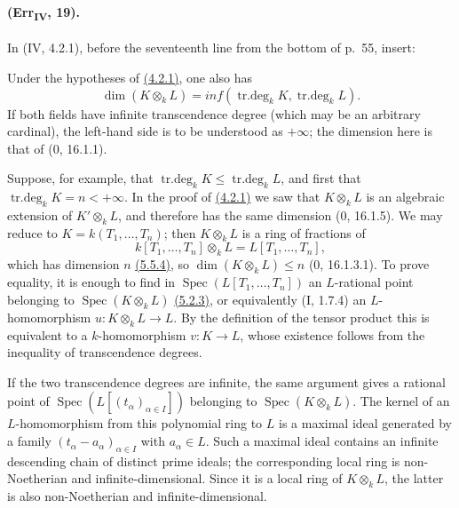 \paragraph{(Err\textsubscript{IV}, 19).}
In (IV, 4.2.1), before the seventeenth line from the bottom of p.~55,
insert:

\begin{remark}[4.2.1.4]
\label{IV.4.2.1.4}
Under the hypotheses of {\hyperlink{ega4.c04.prop.4-2-1}{(4.2.1)}}, one also has
\begin{equation}
 \dim(K\otimes_kL)=inf(\operatorname{tr.deg}_kK,
                           \operatorname{tr.deg}_kL). \label{IV.4.2.1.5}
\tag{4.2.1.5}
\end{equation}
If both fields have infinite transcendence degree (which may be an
arbitrary cardinal), the left-hand side is to be understood as
$+\infty$; the dimension here is that of ($0$, 16.1.1).

Suppose, for example, that
$\operatorname{tr.deg}_kK\leq\operatorname{tr.deg}_kL$, and first that
$\operatorname{tr.deg}_kK=n<+\infty$.  In the proof of {\hyperlink{ega4.c04.prop.4-2-1}{(4.2.1)}} we saw
that $K\otimes_kL$ is an algebraic extension of $K'\otimes_kL$, and
therefore has the same dimension ($0$, 16.1.5).  We may reduce to
$K=k(T_1,\ldots,T_n)$; then $K\otimes_kL$ is a ring of fractions of
\[
 k[T_1,\ldots,T_n]\otimes_kL=L[T_1,\ldots,T_n],
\]
which has dimension $n$ {\hyperlink{ega4.c04.cor.5-5-4}{(5.5.4)}}, so
$\dim(K\otimes_kL)\leq n$ ($0$, 16.1.3.1).  To prove equality, it is
enough to find in $\operatorname{Spec}(L[T_1,\ldots,T_n])$ an
$L$-rational point belonging to $\operatorname{Spec}(K\otimes_kL)$
{\hyperlink{ega4.c04.cor.5-2-3}{(5.2.3)}}, or equivalently (I, 1.7.4) an $L$-homomorphism
$u:K\otimes_kL\to L$.  By the definition of the tensor product this is
equivalent to a $k$-homomorphism $v:K\to L$, whose existence follows
from the inequality of transcendence degrees.

If the two transcendence degrees are infinite, the same argument gives
a rational point of $\operatorname{Spec}(L[(t_\alpha)_{\alpha\in I}])$
belonging to $\operatorname{Spec}(K\otimes_kL)$.  The kernel of an
$L$-homomorphism from this polynomial ring to $L$ is a maximal ideal
generated by a family $(t_\alpha-a_\alpha)_{\alpha\in I}$ with
$a_\alpha\in L$.  Such a maximal ideal contains an infinite descending
chain of distinct prime ideals; the corresponding local ring is
non-Noetherian and infinite-dimensional.  Since it is a local ring of
$K\otimes_kL$, the latter is also non-Noetherian and
infinite-dimensional.
\end{remark}

